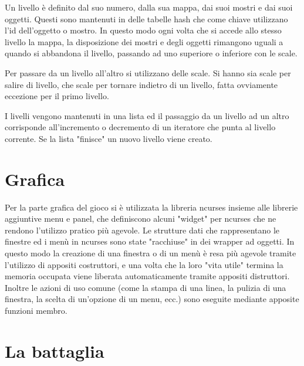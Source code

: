 \documentclass[10pt]{report}
\begin{document}
Un livello è definito dal suo numero, dalla sua mappa, dai suoi mostri e dai suoi oggetti. Questi sono mantenuti in
delle tabelle hash che come chiave utilizzano l'id dell'oggetto o mostro. In questo modo ogni volta che si accede allo
stesso livello la mappa, la disposizione dei mostri e degli oggetti rimangono uguali a quando si abbandona il livello,
passando ad uno superiore o inferiore con le scale.

Per passare da un livello all'altro si utilizzano delle scale. Si hanno sia scale per salire di livello, che scale per
tornare indietro di un livello, fatta ovviamente eccezione per il primo livello.

I livelli vengono mantenuti in una lista ed il passaggio da un livello ad un altro corrisponde all'incremento o
decremento di un iteratore che punta al livello corrente. Se la lista "finisce" un nuovo livello viene creato.

\section{Grafica}

Per la parte grafica del gioco si è utilizzata la libreria ncurses insieme alle librerie aggiuntive menu e
panel, che definiscono alcuni "widget" per ncurses che ne rendono l'utilizzo pratico più agevole. Le strutture dati che
rappresentano le finestre ed i menù in ncurses sono state "racchiuse" in dei wrapper ad oggetti. In questo modo la
creazione di una finestra o di un menù è resa più agevole tramite l'utilizzo di appositi costruttori, e una volta che
la loro "vita utile" termina la memoria occupata viene liberata automaticamente tramite appositi distruttori. Inoltre le
azioni di uso comune (come la stampa di una linea, la pulizia di una finestra, la scelta di un'opzione di un menu,
ecc.) sono eseguite mediante apposite funzioni membro.

\section{La battaglia}
\end{document}
